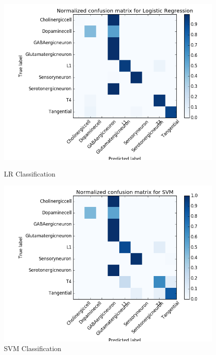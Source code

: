 \documentclass[10pt,twocolumn]{article}
\begin{document}
\begin{figure}[htbp] 
	\begin{minipage}{0.5\linewidth} 
		\centering 
		\includegraphics[width=\textwidth]{img/LGmatrix.png} 
		\caption{LR Classification} 
		\label{fig:LRmat} 
	\end{minipage}%
	\begin{minipage}{0.5\linewidth} 
		\centering 
		\includegraphics[width=\textwidth]{img/SVMmatrix.png}
		\caption{SVM Classification} 
		\label{fig:SVMmat} 
	\end{minipage}
\end{figure}	
\end{document}
